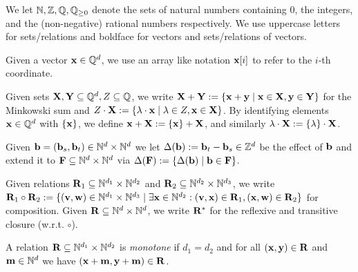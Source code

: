 
We let $\mathbb{N}, \mathbb{Z}, \mathbb{Q}, \mathbb{Q}_{\geq 0}$ denote the sets of natural numbers containing \(0\), the integers, and the (non-negative) rational numbers respectively. We use uppercase letters for sets/relations and boldface for vectors and sets/relations of vectors. 

Given a vector \(\mathbf{x} \in \mathbb{Q}^d\), we use an array like notation \(\mathbf{x}[i]\) to refer to the \(i\)-th coordinate. 

Given sets \(\mathbf{X},\mathbf{Y} \subseteq \mathbb{Q}^d, Z \subseteq \mathbb{Q}\), we write \(\mathbf{X}+\mathbf{Y}:=\{\mathbf{x}+\mathbf{y} \mid \mathbf{x} \in \mathbf{X}, \mathbf{y} \in \mathbf{Y}\}\) for the Minkowski sum and \(Z \cdot \mathbf{X}:=\{\lambda \cdot \mathbf{x} \mid \lambda \in Z, \mathbf{x} \in \mathbf{X}\}\). By identifying elements \(\mathbf{x}\in \mathbb{Q}^d\) with \(\{\mathbf{x}\}\), we define \(\mathbf{x}+\mathbf{X}:=\{\mathbf{x}\}+\mathbf{X}\), and similarly \(\lambda \cdot \mathbf{X}:=\{\lambda\} \cdot \mathbf{X}\). %


Given \(\mathbf{b}=(\mathbf{b}_s, \mathbf{b}_t) \in \mathbb{N}^d \times \mathbb{N}^d\) we let \(\operatorname{\operatorname{\Delta}}(\mathbf{b}):=\mathbf{b}_t-\mathbf{b}_s \in \mathbb{Z}^d\) be the effect of \(\mathbf{b}\) and extend it to \(\mathbf{F}\subseteq \mathbb{N}^d \times \mathbb{N}^d \) via \(\operatorname{\operatorname{\Delta}}(\mathbf{F}):=\{\operatorname{\operatorname{\Delta}}(\mathbf{b}) \mid \mathbf{b} \in \mathbf{F}\}\). 

Given relations \(\mathbf{R}_1 \subseteq \mathbb{N}^{d_1} \times \mathbb{N}^{d_2}\) and \(\mathbf{R}_2 \subseteq \mathbb{N}^{d_2} \times \mathbb{N}^{d_3}\), we write \(\mathbf{R}_1 \circ \mathbf{R}_2 :=\{(\mathbf{v}, \mathbf{w}) \in \mathbb{N}^{d_1} \times \mathbb{N}^{d_3} \mid \exists \mathbf{x} \in \mathbb{N}^{d_2}: (\mathbf{v}, \mathbf{x}) \in \mathbf{R}_1, (\mathbf{x}, \mathbf{w}) \in \mathbf{R}_2\}\) for composition. Given \(\mathbf{R} \subseteq \mathbb{N}^{d} \times \mathbb{N}^{d}\), we write \(\mathbf{R}^{\ast}\) for the reflexive and transitive closure (w.r.t. \(\circ\)).

A relation \(\mathbf{R} \subseteq \mathbb{N}^{d_1} \times \mathbb{N}^{d_2}\) is \emph{monotone} if \(d_1=d_2\) and for all \((\mathbf{x}, \mathbf{y}) \in \mathbf{R}\) and \(\mathbf{m} \in \mathbb{N}^d\) we have \((\mathbf{x}+\mathbf{m}, \mathbf{y}+\mathbf{m}) \in \mathbf{R}\).

